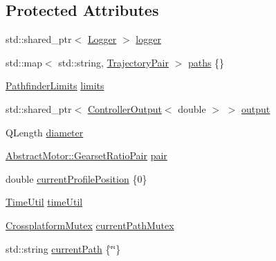 \subsection*{Protected Attributes}
\begin{DoxyCompactItemize}
\item 
std\+::shared\+\_\+ptr$<$ \mbox{\hyperlink{classokapi_1_1Logger}{Logger}} $>$ \mbox{\hyperlink{classokapi_1_1AsyncLinearMotionProfileController_abfdbc29ef850cf20ed15b3c1398c7cc1}{logger}}
\item 
std\+::map$<$ std\+::string, \mbox{\hyperlink{structokapi_1_1AsyncLinearMotionProfileController_1_1TrajectoryPair}{Trajectory\+Pair}} $>$ \mbox{\hyperlink{classokapi_1_1AsyncLinearMotionProfileController_a955697ca2debe00771c8039b3df328f0}{paths}} \{\}
\item 
\mbox{\hyperlink{structokapi_1_1PathfinderLimits}{Pathfinder\+Limits}} \mbox{\hyperlink{classokapi_1_1AsyncLinearMotionProfileController_a9d2bb17d4a934984d488b3b4fba11c6e}{limits}}
\item 
std\+::shared\+\_\+ptr$<$ \mbox{\hyperlink{classokapi_1_1ControllerOutput}{Controller\+Output}}$<$ double $>$ $>$ \mbox{\hyperlink{classokapi_1_1AsyncLinearMotionProfileController_a5a718fd422ce52e613e1d231910860a9}{output}}
\item 
Q\+Length \mbox{\hyperlink{classokapi_1_1AsyncLinearMotionProfileController_a0b3cafe78cb551d68c2cb6ac31d1a753}{diameter}}
\item 
\mbox{\hyperlink{structokapi_1_1AbstractMotor_1_1GearsetRatioPair}{Abstract\+Motor\+::\+Gearset\+Ratio\+Pair}} \mbox{\hyperlink{classokapi_1_1AsyncLinearMotionProfileController_a3727388c1310a387524b7d38d5c0b1b0}{pair}}
\item 
double \mbox{\hyperlink{classokapi_1_1AsyncLinearMotionProfileController_a94c203e635765357bd825ffc4d061741}{current\+Profile\+Position}} \{0\}
\item 
\mbox{\hyperlink{classokapi_1_1TimeUtil}{Time\+Util}} \mbox{\hyperlink{classokapi_1_1AsyncLinearMotionProfileController_a320e12b446817ebc8dfb01c6bb36e3cb}{time\+Util}}
\item 
\mbox{\hyperlink{classCrossplatformMutex}{Crossplatform\+Mutex}} \mbox{\hyperlink{classokapi_1_1AsyncLinearMotionProfileController_a5645f7c2eff01ca271d14fafcebbf2a8}{current\+Path\+Mutex}}
\item 
std\+::string \mbox{\hyperlink{classokapi_1_1AsyncLinearMotionProfileController_a010cd3afaa58154ee7a32059cadae555}{current\+Path}} \{\char`\"{}\char`\"{}\}
\item 

\end{DoxyCompactItemize}
